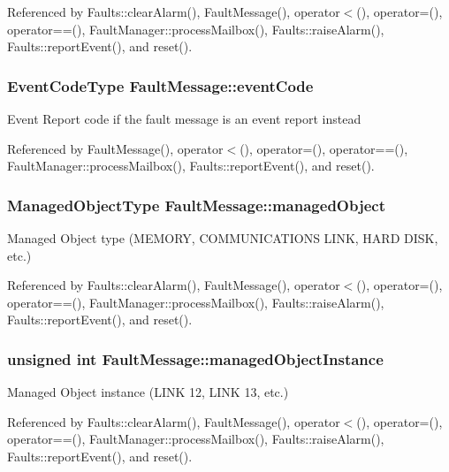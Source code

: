 Referenced by Faults\+::clear\+Alarm(), Fault\+Message(), operator$<$(), operator=(), operator==(), Fault\+Manager\+::process\+Mailbox(), Faults\+::raise\+Alarm(), Faults\+::report\+Event(), and reset().

\subsubsection[{event\+Code}]{\setlength{\rightskip}{0pt plus 5cm}Event\+Code\+Type Fault\+Message\+::event\+Code}\label{structFaultMessage_a6e0ec292fcea91f8c40443f2c5123ead}
Event Report code if the fault message is an event report instead 

Referenced by Fault\+Message(), operator$<$(), operator=(), operator==(), Fault\+Manager\+::process\+Mailbox(), Faults\+::report\+Event(), and reset().

\subsubsection[{managed\+Object}]{\setlength{\rightskip}{0pt plus 5cm}Managed\+Object\+Type Fault\+Message\+::managed\+Object}\label{structFaultMessage_a338dc5f9d9d52a9478b474b584f82b9b}
Managed Object type (M\+E\+M\+O\+RY, C\+O\+M\+M\+U\+N\+I\+C\+A\+T\+I\+O\+NS L\+I\+NK, H\+A\+RD D\+I\+SK, etc.) 

Referenced by Faults\+::clear\+Alarm(), Fault\+Message(), operator$<$(), operator=(), operator==(), Fault\+Manager\+::process\+Mailbox(), Faults\+::raise\+Alarm(), Faults\+::report\+Event(), and reset().

\subsubsection[{managed\+Object\+Instance}]{\setlength{\rightskip}{0pt plus 5cm}unsigned int Fault\+Message\+::managed\+Object\+Instance}\label{structFaultMessage_af32676d42b21fe98ddd5bb3ebcf06b29}
Managed Object instance (L\+I\+NK 12, L\+I\+NK 13, etc.) 

Referenced by Faults\+::clear\+Alarm(), Fault\+Message(), operator$<$(), operator=(), operator==(), Fault\+Manager\+::process\+Mailbox(), Faults\+::raise\+Alarm(), Faults\+::report\+Event(), and reset().

